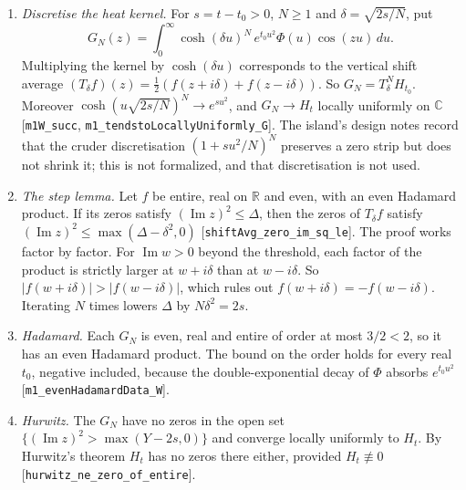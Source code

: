 \documentclass[11pt]{article}
\theoremstyle{definition}
\newcommand{\lean}[1]{\texttt{#1}}
\newcommand{\im}{\operatorname{Im}}
\newcommand{\C}{\mathbb{C}}
\newcommand{\R}{\mathbb{R}}
\begin{document}
\begin{enumerate}[label=\arabic*.]
\item \emph{Discretise the heat kernel.} For $s = t - t_0 > 0$, $N \ge 1$ and $\delta = \sqrt{2s/N}$, put
\[
G_N(z) = \int_0^\infty \cosh(\delta u)^N\,e^{t_0u^2}\Phi(u)\cos(zu)\,du .
\]
Multiplying the kernel by $\cosh(\delta u)$ corresponds to the vertical shift average $(T_\delta f)(z) = \tfrac12(f(z+i\delta) + f(z-i\delta))$. So $G_N = T_\delta^N H_{t_0}$. Moreover $\cosh(u\sqrt{2s/N})^N \to e^{su^2}$, and $G_N \to H_t$ locally uniformly on $\C$ [\lean{m1W\_\allowbreak{}succ}, \lean{m1\_\allowbreak{}tendstoLocallyUniformly\_\allowbreak{}G}]. The island's design notes record that the cruder discretisation $(1 + su^2/N)^N$ preserves a zero strip but does not shrink it; this is not formalized, and that discretisation is not used.
\item \emph{The step lemma.} Let $f$ be entire, real on $\R$ and even, with an even Hadamard product. If its zeros satisfy $(\im z)^2 \le \Delta$, then the zeros of $T_\delta f$ satisfy $(\im z)^2 \le \max(\Delta - \delta^2, 0)$ [\lean{shiftAvg\_\allowbreak{}zero\_\allowbreak{}im\_\allowbreak{}sq\_\allowbreak{}le}]. The proof works factor by factor. For $\im w > 0$ beyond the threshold, each factor of the product is strictly larger at $w + i\delta$ than at $w - i\delta$. So $|f(w+i\delta)| > |f(w-i\delta)|$, which rules out $f(w+i\delta) = -f(w-i\delta)$. Iterating $N$ times lowers $\Delta$ by $N\delta^2 = 2s$.
\item \emph{Hadamard.} Each $G_N$ is even, real and entire of order at most $3/2 < 2$, so it has an even Hadamard product. The bound on the order holds for every real $t_0$, negative included, because the double-exponential decay of $\Phi$ absorbs $e^{t_0u^2}$ [\lean{m1\_\allowbreak{}evenHadamardData\_\allowbreak{}W}].
\item \emph{Hurwitz.} The $G_N$ have no zeros in the open set $\{(\im z)^2 > \max(Y - 2s, 0)\}$ and converge locally uniformly to $H_t$. By Hurwitz's theorem $H_t$ has no zeros there either, provided $H_t \not\equiv 0$ [\lean{hurwitz\_\allowbreak{}ne\_\allowbreak{}zero\_\allowbreak{}of\_\allowbreak{}entire}].
\end{enumerate}
\end{document}

